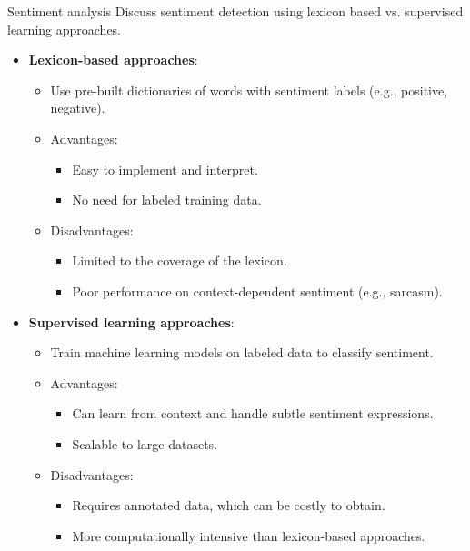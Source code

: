 \documentclass{article}
\begin{document}
\begin{exercise}{Sentiment analysis}
  Discuss sentiment detection using lexicon based vs. supervised learning approaches.

  \begin{solution}
    \begin{itemize}
        \item \textbf{Lexicon-based approaches}: 
        \begin{itemize}
            \item Use pre-built dictionaries of words with sentiment labels (e.g., positive, negative).
            \item Advantages:
                \begin{itemize}
                    \item Easy to implement and interpret.
                    \item No need for labeled training data.
                \end{itemize}
            \item Disadvantages:
                \begin{itemize}
                    \item Limited to the coverage of the lexicon.
                    \item Poor performance on context-dependent sentiment (e.g., sarcasm).
                \end{itemize}
        \end{itemize}
        \item \textbf{Supervised learning approaches}:
        \begin{itemize}
            \item Train machine learning models on labeled data to classify sentiment.
            \item Advantages:
                \begin{itemize}
                    \item Can learn from context and handle subtle sentiment expressions.
                    \item Scalable to large datasets.
                \end{itemize}
            \item Disadvantages:
                \begin{itemize}
                    \item Requires annotated data, which can be costly to obtain.
                    \item More computationally intensive than lexicon-based approaches.
                \end{itemize}
        \end{itemize}
    \end{itemize}
  \end{solution}
\end{exercise}
\end{document}
